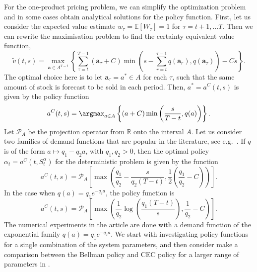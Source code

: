 \documentclass[main.tex]{subfiles}
\begin{document}
For the one-product pricing problem, we can simplify the optimization
problem and in some cases obtain analytical solutions for the policy function.
First, let us consider the expected value estimate $w_\tau=\mathbb E
[W_\tau]=1$ for $\tau=t+1,\dots T$.
Then we can rewrite the maximisation problem to find
the certainty equivalent value function,
\begin{equation}
  \widetilde{v}(t,s)=
  \max_{\mathbf a\in A^{T-t}}\left\{\sum_{\tau=t}^{T-1}(\mathbf
    a_\tau+C)\min\left(s-\sum_{r=t}^{\tau-1}q(\mathbf a_r),q(\mathbf a_\tau)\right)-Cs\right\}.
\end{equation}
The optimal choice here is to let $\mathbf a_\tau=a^*\in A$ for each
$\tau$, such that the same amount of stock is forecast to be sold in
each period.
Then, $a^*=a^C(t,s)$ is given by the policy function
\begin{equation}
  a^C(t,s)=\argmax_{a\in A} \left\{(a+C)\min\left(
      \frac{s}{T-t},q(a)
    \right)\right\}.
\end{equation}
Let $\mathcal P_A$ be the projection operator from $\mathbb R$ onto the interval $A$.
Let us consider two families of demand functions that are
popular in the literature, see e.g.~\citet[Ch.~7]{talluri2006theory}.
If $q$ is of the form $a\mapsto q_1-q_2a$, with $q_1,q_2> 0$, then
the optimal policy $\alpha_t=a^C(t,S_t^\alpha)$ for the deterministic
problem is given by the function
\begin{equation}
  a^C(t,s)=\mathcal P_A \left[ \max\left(
      \frac{q_1}{q_2}-\frac{s}{q_2(T-t)},\frac{1}{2}\left(\frac{q_1}{q_2}-C
      \right) \right) \right].
\end{equation}
In the case when $q(a)=q_1e^{-q_2a}$, the policy function is
\begin{equation}\label{eq:cec_policy}
  a^C(t,s)=\mathcal P_A\left[
    \max\left( \frac{1}{q_2}\log\left( \frac{q_1(T-t)}{s}\right),
      \frac{1}{q_2}-C  \right)\right].
\end{equation}
The numerical experiments in the article are
done with a demand function of the exponential family
$q(a)=q_1e^{-q_2a}$.
We start with investigating policy functions for a
single combination of the  system
parameters, and then consider make a
comparison between the Bellman policy and CEC policy for a larger
range of parameters in .
\end{document}

